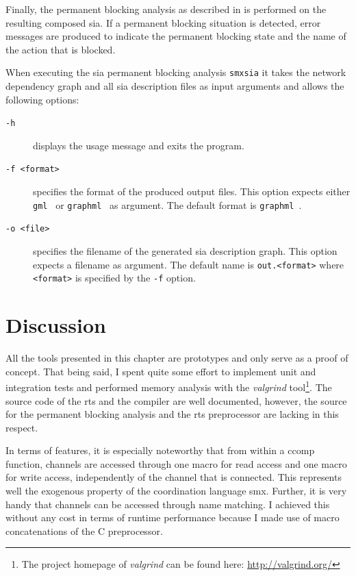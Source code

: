 Finally, the permanent blocking analysis as described in \Sect{\ref{chap_block}} is performed on the resulting composed \gls{sia}.
If a permanent blocking situation is detected, error messages are produced to indicate the permanent blocking state and the name of the action that is blocked.

When executing the \gls{sia} permanent blocking analysis \texttt{smxsia} it takes the network dependency graph and all \gls{sia} description files as input arguments and allows the following options:
\begin{description}
    \item[\texttt{-h}] displays the usage message and exits the program.
    \item[\texttt{-f <format>}] specifies the format of the produced output files.
        This option expects either \texttt{gml}~\cite{himsolt1996} or \texttt{graphml}~\cite{brandes2001} as argument.
        The default format is \texttt{graphml}~\cite{brandes2001}.
    \item[\texttt{-o <file>}] specifies the filename of the generated \gls{sia} description graph.
        This option expects a filename as argument.
        The default name is \texttt{out.<format>} where \texttt{<format>} is specified by the \texttt{-f} option.
\end{description}

\section{Discussion}
\label{sect_tool_discussion}
All the tools presented in this chapter are prototypes and only serve as a proof of concept.
That being said, I spent quite some effort to implement unit and integration tests and performed memory analysis with the \emph{valgrind} tool\footnote{The project homepage of \emph{valgrind} can be found here: \url{http://valgrind.org/}}.
The source code of the \gls{rts} and the compiler are well documented, however, the source for the permanent blocking analysis and the \gls{rts} preprocessor are lacking in this respect.

In terms of features, it is especially noteworthy that from within a \gls*{ccomp} function, channels are accessed through one macro for read access and one macro for write access, independently of the channel that is connected.
This represents well the exogenous property of the coordination language \gls*{smx}.
Further, it is very handy that channels can be accessed through name matching.
I achieved this without any cost in terms of runtime performance because I made use of macro concatenations of the C preprocessor.

